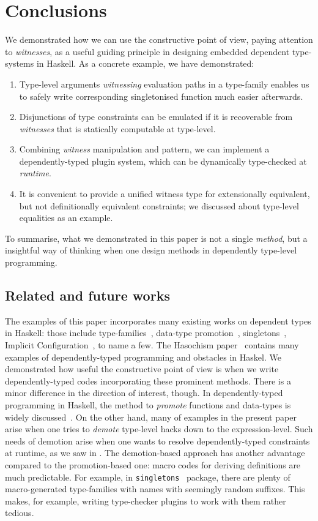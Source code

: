 \documentclass[demotion-paper.tex]{subfiles}
\begin{document}
\section{Conclusions}
\label{sec:concl}
We demonstrated how we can use the constructive point of view, paying attention to \emph{witnesses}, as a useful guiding principle in designing embedded dependent type-systems in Haskell.
As a concrete example, we have demonstrated:
\begin{enumerate}
  \item Type-level arguments \emph{witnessing} evaluation paths in a type-family enables us to safely write corresponding singletonised function much easier afterwards.
  \item Disjunctions of type constraints can be emulated if it is recoverable from \emph{witnesses} that is statically computable at type-level.
  \item Combining \emph{witness} manipulation and  pattern, we can implement a dependently-typed plugin system, which can be dynamically type-checked at \emph{runtime}.
  \item It is convenient to provide a unified witness type for extensionally equivalent, but not definitionally equivalent constraints; we discussed about type-level equalities as an example.
\end{enumerate}
To summarise, what we demonstrated in this paper is not a single \emph{method}, but a insightful way of thinking when one design methods in dependently type-level programming.

\subsection{Related and future works}
The examples of this paper incorporates many existing works on dependent types in Haskell: those include type-families~\cite{Kiselyov:2010aa}, data-type promotion~\cite{Yorgey:2012}, singletons~\cite{Eisenberg:2012}, Implicit Configuration~\cite{Kiselyov:2004aa}, to name a few.
The Hasochism paper~\cite{10.1145/2503778.2503786} contains many examples of dependently-typed programming and obstacles in Haskel.
We demonstrated how useful the constructive point of view is when we write dependently-typed codes incorporating these prominent methods.
There is a minor difference in the direction of interest, though.
In dependently-typed programming in Haskell, the method to \emph{promote} functions and data-types is widely discussed~\cite{Yorgey:2012,Eisenberg:2012,10.1145/2503778.2503786}.
On the other hand, many of examples in the present paper arise when one tries to \emph{demote} type-level hacks down to the expression-level.
Such needs of demotion arise when one wants to resolve dependently-typed constraints at runtime, as we saw in .
The demotion-based approach has another advantage compared to the promotion-based one: macro codes for deriving definitions are much predictable.
For example, in \texttt{singletons}~\cite{singletons} package, there are plenty of macro-generated type-families with names with seemingly random suffixes.
This makes, for example, writing type-checker plugins to work with them rather tedious.
\end{document}
